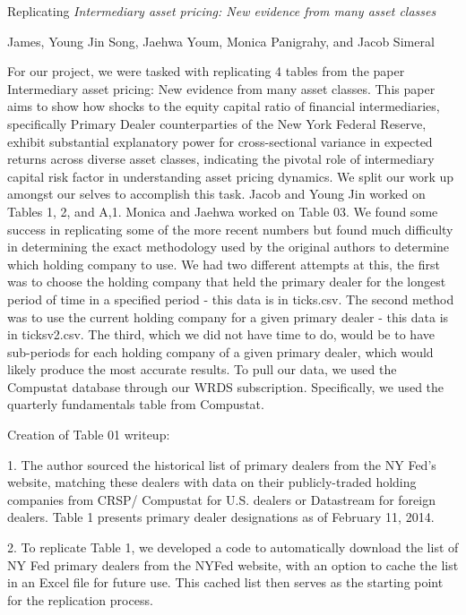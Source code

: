 \documentclass{article}
\begin{document}
\usepackage{color}
{
\fontsize{12}{14}\selectfont
\textnormal{Replicating} \textit{Intermediary asset pricing: New evidence from many asset classes}
}

\bigskip

{
\fontsize{10}{12}\selectfont
James, Young Jin Song, Jaehwa Youm, Monica Panigrahy, and Jacob Simeral
}
\par

For our project, we were tasked with replicating 4 tables from the paper Intermediary asset pricing: New evidence from many asset classes. This paper aims to show how shocks to the equity capital ratio of financial intermediaries, specifically Primary Dealer counterparties of the New York Federal Reserve, exhibit substantial explanatory power for cross-sectional variance in expected returns across diverse asset classes, indicating the pivotal role of intermediary capital risk factor in understanding asset pricing dynamics. We split our work up amongst our selves to accomplish this task. Jacob and Young Jin worked on Tables 1, 2, and A,1. Monica and Jaehwa worked on Table 03.
We found some success in replicating some of the more recent numbers but found much difficulty in determining the exact methodology used by the original authors to determine which holding company to use. We had two different attempts at this, the first was to choose the holding company that held the primary dealer for the longest period of time in a specified period - this data is in ticks.csv. The second method was to use the current holding company for a given primary dealer - this data is in ticksv2.csv. The third, which we did not have time to do, would be to have sub-periods for each holding company of a given primary dealer, which would likely produce the most accurate results.
To pull our data, we used the Compustat database through our WRDS subscription. Specifically, we used the quarterly fundamentals table from Compustat.
\par

\par
Creation of Table 01 writeup:

1. The author sourced the historical list of primary dealers from the NY Fed's website, 
matching these dealers with data on their publicly-traded holding companies from CRSP/
Compustat for U.S. dealers or Datastream for foreign dealers. Table 1 presents primary 
dealer designations as of February 11, 2014.

2. To replicate Table 1, we developed a code to automatically download the list of NY Fed 
primary dealers from the NYFed website, with an option to cache the list in an Excel file 
for future use. This cached list then serves as the starting point for the replication process.
\end{document}
